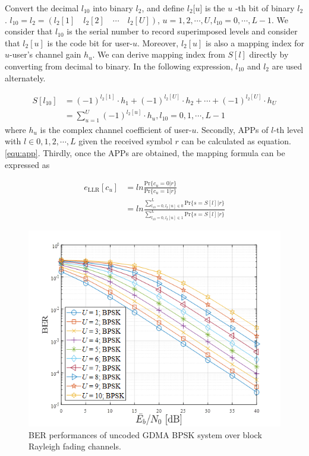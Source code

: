 Convert the decimal $l_{10}$ into binary $l_{2}$, and define $l_{2}$[$u$] is the $u$ -th bit of binary $l_{2}$.  $l_{10} = l_{2} = (l_{2}[1] \quad l_{2}[2] \quad \cdots \quad l_{2}[U])$, $u=1,2,\cdots,U, l_{10} = 0, \cdots, L-1$. We consider that $l_{10}$ is the serial number to record superimposed levels and consider that $l_2[u]$ is the code bit for user-$u$. Moreover, $l_2[u]$ is also a mapping index for $u$-user's channel gain $h_u$. We can derive mapping index from $S[l]$ directly by converting from decimal to binary. In the following expression, $l_{10}$ and $l_2$ are used alternately.

\begin{align}
S[l_{10}] &={(-1)}^{l_{2}[1]} \cdot h_{1}+{(-1)}^{l_{2}[U]} \cdot h_{2}+ \cdots + {(-1)}^{l_{2}[U]} \cdot h_{U} 
\nonumber \\
&= \sum_{u=1}^{U} (-1)^{l_2[u]} \cdot h_u, l_{10} = 0, 1, \cdots, L-1 
\label{equ:implementation_1}
\end{align}
where $h_{u}$ is the complex channel coefficient of user-$u$. Secondly, APPs of $l$-th level with $l\in{0,1,2,\cdots,L}$ given the received symbol $r$ can be calculated as equation.\ref{equ:app}. Thirdly, once the APPs are obtained, the mapping formula can be expressed as 

\begin{align}
e_{\text{LLR}}[c_u] &= ln \frac{\text{Pr}\{c_u=0|r\}}{\text{Pr}\{c_u=1|r\}}
\nonumber \\
&= ln \frac{\sum_{l_{10}=0, l_{2}[u]\in{0}}^{L}\text{Pr}\{s=S[l]|r\}}{\sum_{l_{10}=0, l_{2}[u]\in{1}}^{L}\text{Pr}\{s=S[l]|r\}}
\label{equ:implementation_2}
\end{align}

\begin{figure}[b!]
 \centering
 \includegraphics[width=15cm]{fig/gdma_bpsk_implement_u2.png}
 \caption{BER performances of uncoded GDMA BPSK system over block Rayleigh fading channels.}
 \label{fig:bpsk_implementation}
\end{figure}

